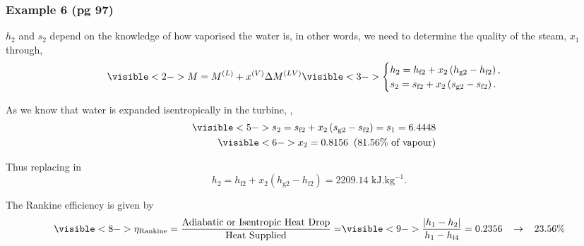 \documentclass[10pt,compress,unknownkeysallowed]{beamer}
\begin{document}
\begin{frame}
   \frametitle{Example 6 (pg 97)}
          {$h_{2}$ and $s_{2}$ depend on the knowledge of how vaporised the water is, in other words, we need to determine the quality of the steam, $x_{1}$ through},
         \begin{displaymath}
              \visible<2->{M = \mfr[M]{}{L} + \mfr[x]{}{V}\Delta\mfr[M]{}{LV}}
              \visible<3->{ \begin{cases}
                      h_{2} = h_{\text{f}2} + x_{2}\left(h_{\text{g}2} - h_{\text{f}2}\right), \\
                      s_{2} = s_{\text{f}2} + x_{2}\left(s_{\text{g}2} - s_{\text{f}2}\right).  
              \end{cases}}
         \end{displaymath}

          {As we know that water is expanded isentropically in the turbine, \ie {},}
         \begin{eqnarray}
             && \visible<5-> {s_{2} = s_{\text{f}2} + x_{2}\left(s_{\text{g}2} - s_{\text{f}2}\right) = s_{1} = 6.4448}  \nonumber \\
             && \visible<6-> {x_{2} = 0.8156 \;\;(81.56\% \text{ of vapour})}\nonumber
         \end{eqnarray}

          {Thus replacing in 
             \begin{displaymath}
                h_{2} = h_{\text{f}2} + x_{2}\left(h_{\text{g}2} - h_{\text{f}2}\right) = 2209.14\text{ kJ.kg}^{-1}.
             \end{displaymath}}

          {The Rankine efficiency is given by}
             \begin{displaymath}
                 \visible<8-> {\eta_{\text{Rankine}} = \frc{\text{Adiabatic or Isentropic Heat Drop}}{\text{Heat Supplied}} =} \visible<9-> {\frc{\left|h_{1}-h_{2}\right|}{h_{1}-h_{\text{f}4}} = 0.2356\;\;\;\rightarrow \;\;\; 23.56\%}
             \end{displaymath}
\end{frame}
\end{document}
